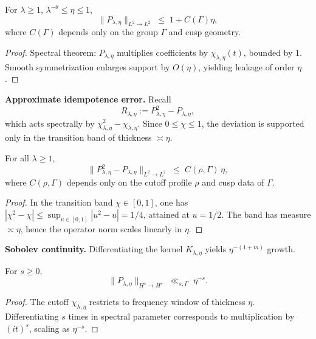\begin{lemma}\label{lem:norm}
For $\lambda\ge 1$, $\lambda^{-\theta}\le\eta\le 1$,
\[
  \|P_{\lambda,\eta}\|_{L^2\to L^2} \;\leq\; 1+C(\Gamma)\eta,
\]
where $C(\Gamma)$ depends only on the group $\Gamma$ and cusp geometry.
\end{lemma}

\begin{proof}
Spectral theorem: $P_{\lambda,\eta}$ multiplies coefficients by $\chi_{\lambda,\eta}(t)$, bounded by $1$.
Smooth symmetrization enlarges support by $O(\eta)$, yielding leakage of order $\eta$.
\end{proof}

\medskip
\noindent\textbf{Approximate idempotence error.}
Recall
\[
  R_{\lambda,\eta}:=P_{\lambda,\eta}^2-P_{\lambda,\eta},
\]
which acts spectrally by $\chi_{\lambda,\eta}^2-\chi_{\lambda,\eta}$.
Since $0\le \chi\le 1$, the deviation is supported only in the transition band of thickness $\asymp\eta$.

\begin{lemma}\label{lem:idempotence-error}
For all $\lambda\ge 1$,
\[
  \|P_{\lambda,\eta}^2-P_{\lambda,\eta}\|_{L^2\to L^2} \;\leq\; C(\rho,\Gamma)\,\eta,
\]
where $C(\rho,\Gamma)$ depends only on the cutoff profile $\rho$ and cusp data of $\Gamma$.
\end{lemma}

\begin{proof}
In the transition band $\chi\in[0,1]$, one has
$|\chi^2-\chi|\leq \sup_{u\in[0,1]}|u^2-u|=1/4$,
attained at $u=1/2$.
The band has measure $\asymp\eta$, hence the operator norm scales linearly in $\eta$.
\end{proof}

\medskip
\noindent\textbf{Sobolev continuity.}
Differentiating the kernel $K_{\lambda,\eta}$ yields $\eta^{-(1+m)}$ growth.

\begin{lemma}\label{lem:sobolev-bounds}
For $s\geq 0$,
\[
  \|P_{\lambda,\eta}\|_{H^s\to H^s} \;\ll_{s,\Gamma}\; \eta^{-s}.
\]
\end{lemma}

\begin{proof}
The cutoff $\chi_{\lambda,\eta}$ restricts to frequency window of thickness $\eta$.
Differentiating $s$ times in spectral parameter corresponds to multiplication by $(it)^s$, 
scaling as $\eta^{-s}$.
\end{proof}

